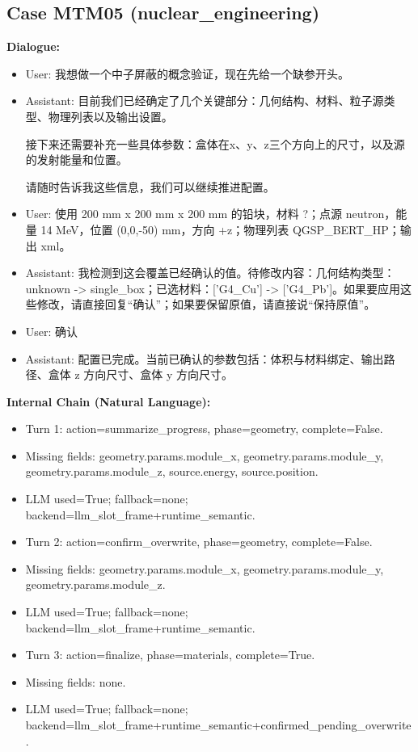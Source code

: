 \documentclass[11pt]{ctexart}
\begin{document}
\subsection{Case MTM05 (nuclear\_engineering)}
\textbf{Dialogue:}
\begin{itemize}
\item User: 我想做一个中子屏蔽的概念验证，现在先给一个缺参开头。
\item Assistant: 目前我们已经确定了几个关键部分：几何结构、材料、粒子源类型、物理列表以及输出设置。

接下来还需要补充一些具体参数：盒体在x、y、z三个方向上的尺寸，以及源的发射能量和位置。

请随时告诉我这些信息，我们可以继续推进配置。
\item User: 使用 200 mm x 200 mm x 200 mm 的铅块，材料 ?；点源 neutron，能量 14 MeV，位置 (0,0,-50) mm，方向 +z；物理列表 QGSP\_BERT\_HP；输出 xml。
\item Assistant: 我检测到这会覆盖已经确认的值。待修改内容：几何结构类型：unknown -> single\_box；已选材料：['G4\_Cu'] -> ['G4\_Pb']。如果要应用这些修改，请直接回复“确认”；如果要保留原值，请直接说“保持原值”。
\item User: 确认
\item Assistant: 配置已完成。当前已确认的参数包括：体积与材料绑定、输出路径、盒体 z 方向尺寸、盒体 y 方向尺寸。
\end{itemize}
\textbf{Internal Chain (Natural Language):}
\begin{itemize}
\item Turn 1: action=summarize\_progress, phase=geometry, complete=False.
\item Missing fields: geometry.params.module\_x, geometry.params.module\_y, geometry.params.module\_z, source.energy, source.position.
\item LLM used=True; fallback=none; backend=llm\_slot\_frame+runtime\_semantic.
\item Turn 2: action=confirm\_overwrite, phase=geometry, complete=False.
\item Missing fields: geometry.params.module\_x, geometry.params.module\_y, geometry.params.module\_z.
\item LLM used=True; fallback=none; backend=llm\_slot\_frame+runtime\_semantic.
\item Turn 3: action=finalize, phase=materials, complete=True.
\item Missing fields: none.
\item LLM used=True; fallback=none; backend=llm\_slot\_frame+runtime\_semantic+confirmed\_pending\_overwrite.
\end{itemize}
\end{document}
